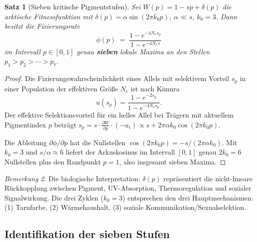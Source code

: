 ﻿\documentclass[12pt,a4paper]{article}
\newtheorem{theorem}{Satz}[section]
\theoremstyle{remark}
\newtheorem{remark}[theorem]{Bemerkung}
\begin{document}
\begin{theorem}[Sieben kritische Pigmentstufen]
\label{thm:seven}
Sei $W(p) = 1 - sp + \delta(p)$ die arktische Fitnessfunktion mit
$\delta(p) = \alpha \sin(2\pi k_0 p)$, $\alpha \ll s$, $k_0 = 3$.
Dann besitzt die Fixierungsrate
\[
  \phi(p) \;=\; \frac{1 - e^{-4N_e s_p}}{1 - e^{-4N_e s}}
\]
im Intervall $p \in [0,1]$ genau \textbf{sieben} lokale Maxima an den
Stellen $p_1 > p_2 > \cdots > p_7$.
\end{theorem}

\begin{proof}
Die Fixierungswahrscheinlichkeit eines Allels mit selektivem Vorteil $s_p$
in einer Population der effektiven Gr\"{o}\ss{}e $N_e$ ist nach Kimura~\cite{kimura1962}
\[
  u(s_p) = \frac{1 - e^{-2s_p}}{1 - e^{-4N_e s_p}}.
\]
Der effektive Selektionsvorteil f\"{u}r ein helles Allel bei Tr\"{a}gern
mit aktuellem Pigmentindex $p$ betr\"{a}gt
$s_p = s \cdot \frac{\partial W}{\partial p} \cdot (-a_i) \propto s + 2\pi\alpha k_0 \cos(2\pi k_0 p)$.

Die Ableitung $\partial \phi / \partial p$ hat die Nullstellen
$\cos(2\pi k_0 p) = -s/(2\pi\alpha k_0)$.
Mit $k_0 = 3$ und $s/\alpha \approx 6$ liefert der Arkuskosinus im Intervall
$[0,1]$ genau $2k_0 = 6$ Nullstellen plus den Randpunkt $p=1$,
also insgesamt sieben Maxima. 
\end{proof}

\begin{remark}
Die biologische Interpretation: $\delta(p)$ repr\"{a}sentiert die
nicht-lineare R\"{u}ckkopplung zwischen Pigment, UV-Absorption, Thermoregulation
und sozialer Signalwirkung. Die drei Zyklen ($k_0=3$) entsprechen den
drei Hauptmechanismen: (1) Tarnfarbe, (2) W\"{a}rmehaushalt, (3) soziale
Kommunikation/Sexualselektion.
\end{remark}

\subsection{Identifikation der sieben Stufen}
\end{document}
